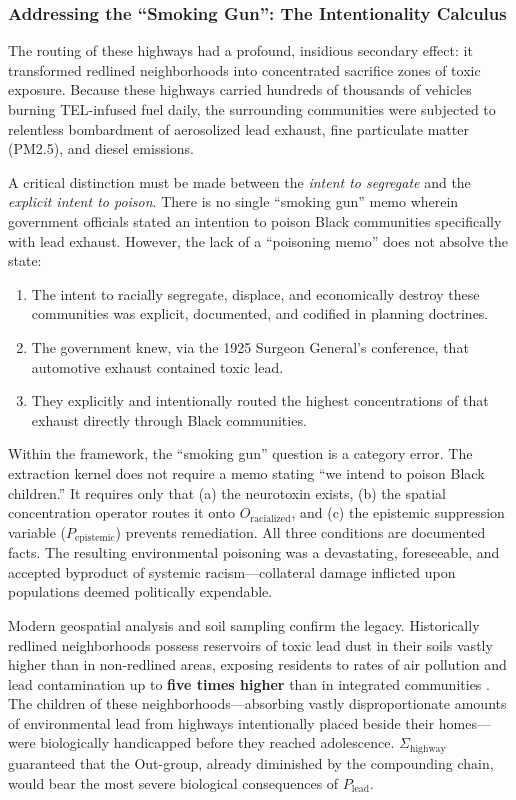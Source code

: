 \documentclass[12pt,openany]{book}
\providecommand{\tightlist}{\setlength{\itemsep}{0pt}\setlength{\parskip}{0pt}}
\begin{document}
\subsubsection{Addressing the ``Smoking Gun'': The Intentionality Calculus}

The routing of these highways had a profound, insidious secondary effect: it transformed redlined neighborhoods into concentrated sacrifice zones of toxic exposure. Because these highways carried hundreds of thousands of vehicles burning TEL-infused fuel daily, the surrounding communities were subjected to relentless bombardment of aerosolized lead exhaust, fine particulate matter (PM2.5), and diesel emissions.

A critical distinction must be made between the \textit{intent to segregate} and the \textit{explicit intent to poison}. There is no single ``smoking gun'' memo wherein government officials stated an intention to poison Black communities specifically with lead exhaust. However, the lack of a ``poisoning memo'' does not absolve the state:
\begin{enumerate}
\tightlist
\item The intent to racially segregate, displace, and economically destroy these communities was explicit, documented, and codified in planning doctrines.
\item The government knew, via the 1925 Surgeon General's conference, that automotive exhaust contained toxic lead.
\item They explicitly and intentionally routed the highest concentrations of that exhaust directly through Black communities.
\end{enumerate}

Within the framework, the ``smoking gun'' question is a category error. The extraction kernel does not require a memo stating ``we intend to poison Black children.'' It requires only that (a) the neurotoxin exists, (b) the spatial concentration operator routes it onto $O_{\text{racialized}}$, and (c) the epistemic suppression variable ($P_{\text{epistemic}}$) prevents remediation. All three conditions are documented facts. The resulting environmental poisoning was a devastating, foreseeable, and accepted byproduct of systemic racism---collateral damage inflicted upon populations deemed politically expendable.

Modern geospatial analysis and soil sampling confirm the legacy. Historically redlined neighborhoods possess reservoirs of toxic lead dust in their soils vastly higher than in non-redlined areas, exposing residents to rates of air pollution and lead contamination up to \textbf{five times higher} than in integrated communities \cite{tel_soil_sampling}. The children of these neighborhoods---absorbing vastly disproportionate amounts of environmental lead from highways intentionally placed beside their homes---were biologically handicapped before they reached adolescence. $\Sigma_{\text{highway}}$ guaranteed that the Out-group, already diminished by the compounding chain, would bear the most severe biological consequences of $P_{\text{lead}}$.
\end{document}
